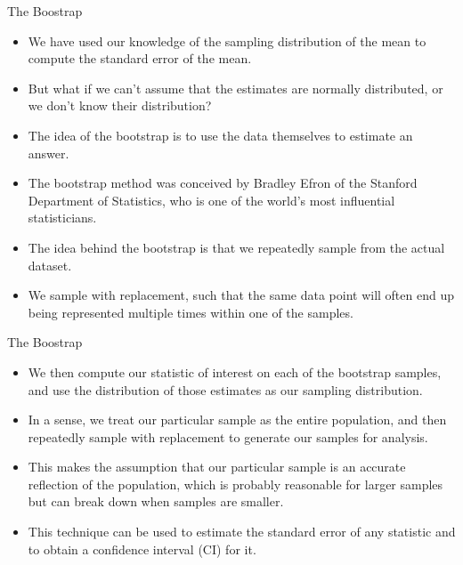 \documentclass[handout]{beamer}
\begin{document}
\begin{frame}{The Boostrap}
\scriptsize{

\begin{itemize}
 \item We have used our knowledge of the sampling distribution of the mean to compute the standard error of the mean. 
 \item But what if we can't assume that the estimates are normally distributed, or we don’t know their distribution? 
 \item The idea of the bootstrap is to use the data themselves to estimate an answer. 
 \item The bootstrap method was conceived by Bradley Efron of the Stanford Department of Statistics, who is one of the world's most influential statisticians.
\item The idea behind the bootstrap is that we repeatedly sample from the actual dataset.

\item We sample with replacement, such that the same data point will often end up being represented multiple times within one of the samples. 

\end{itemize}
}
 
\end{frame}

\begin{frame}{The Boostrap}
\scriptsize{

\begin{itemize}

\item We then compute our statistic of interest on each of the bootstrap samples, and use the distribution of those estimates as our sampling distribution. 



\item In a sense, we treat our particular sample as the entire population, and then repeatedly sample with replacement to generate our samples for analysis.
\item This makes the assumption that our particular sample is an accurate reflection of the population, which is probably reasonable for larger samples but can break down when samples are smaller.

\item This technique can be used to estimate the standard error of any statistic and to obtain a confidence interval (CI) for it. 



\end{itemize}
}
 
\end{frame}
\end{document}

